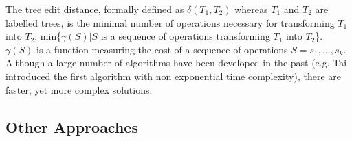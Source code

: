 \documentclass[12pt, notitlepage]{article}
\begin{document}
The tree edit distance, formally defined as $\delta(T_1,T_2)$ whereas $T_1$ and $T_2$ are labelled trees,
is the minimal number of operations necessary for transforming $T_1$ into $T_2$: min\{$\gamma(S)|S$ is a sequence of operations transforming $T_1$ into $T_2$\}. $\gamma(S)$ is a function measuring the cost of a sequence of operations $S=s_1,...,s_k$. \\
Although a large number of algorithms have been developed in the past (e.g. Tai\cite{tai} introduced the first algorithm with non exponential time complexity), there are faster, yet more complex solutions. 

\subsection{Other Approaches}

\newpage


\end{document}

